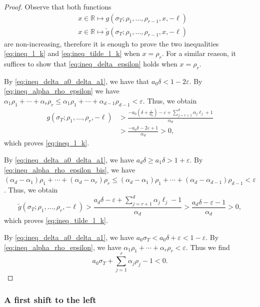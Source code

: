\documentclass[a4paper,12pt]{article}
\theoremstyle{definition}
\numberwithin{equation}{section}
\begin{document}
\begin{proof}
Observe that both functions
\begin{align*}
    &x \in \mathbb{R} \mapsto g(\sigma_T;\rho_1,\ldots,\rho_{r-1},x,-\boldsymbol{\ell}) \\
    &x \in \mathbb{R} \mapsto \widetilde{g}(\sigma_T;\rho_1,\ldots,\rho_{r-1},x,-\boldsymbol{\ell})
\end{align*}
are non-increasing, therefore it is enough to prove the two inequalities \eqref{eq:ineq_l_k} and \eqref{eq:ineq_tilde_l_k} when $x=\rho_r$. For a similar reason, it suffices to show that \eqref{eq:ineq_delta_epsilon} holds when $x=\rho_r$.

By \eqref{eq:ineq_delta_a0_delta_a1}, we have that $a_0 \delta<1-2\varepsilon$. By \eqref{eq:ineq_alpha_rho_epsilon} we have $\alpha_1\rho_1+\cdots +\alpha_r\rho_r \leq \alpha_1\rho_1+\cdots +\alpha_{d-1}\rho_{d-1}<\varepsilon$. Thus, we obtain
\begin{align*}
g(\sigma_T;\rho_1,\ldots,\rho_{r},-\boldsymbol{\ell}) &> 
\frac{-a_0(\delta+\frac{\varepsilon}{a_0})-\varepsilon+
\sum_{j=r+1}^d\alpha_j \ell_j+1}{\alpha_d}\\
&>
\frac{-a_0\delta-2\varepsilon+1}{\alpha_d}>0, 
\end{align*}
which proves \eqref{eq:ineq_l_k}.

By \eqref{eq:ineq_delta_a0_delta_a1}, we have $a_d \delta \geq a_1\delta>1+\varepsilon$. By \eqref{eq:ineq_alpha_rho_epsilon_bis}, we have $(\alpha_d-\alpha_1)\rho_1+\cdots +(\alpha_d-\alpha_r) \rho_{r} \leq (\alpha_d-\alpha_1)\rho_1+\cdots +(\alpha_d-\alpha_{d-1}) \rho_{d-1}<\varepsilon$. Thus, we obtain
$$ \widetilde{g}(\sigma_T;\rho_1,\ldots,\rho_{r},-\boldsymbol{\ell})
>\frac{a_d\delta-\varepsilon+\sum_{j=r+1}^d \alpha_j\ell_j
-1}{\alpha_d} 
>\frac{a_d\delta-\varepsilon-1}{\alpha_d}>0, $$
which proves \eqref{eq:ineq_tilde_l_k}.

By \eqref{eq:ineq_delta_a0_delta_a1}, we have $a_0\sigma_T<a_0\delta+\varepsilon<1-\varepsilon$. By \eqref{eq:ineq_alpha_rho_epsilon}, we have $\alpha_1\rho_1+\cdots +\alpha_r\rho_r<\varepsilon$. Thus we find
$$ a_0\sigma_T+\sum_{j=1}^{r} \alpha_j \rho_j-1 <0. $$
\end{proof}

\subsubsection{A first shift to the left}
\end{document}
